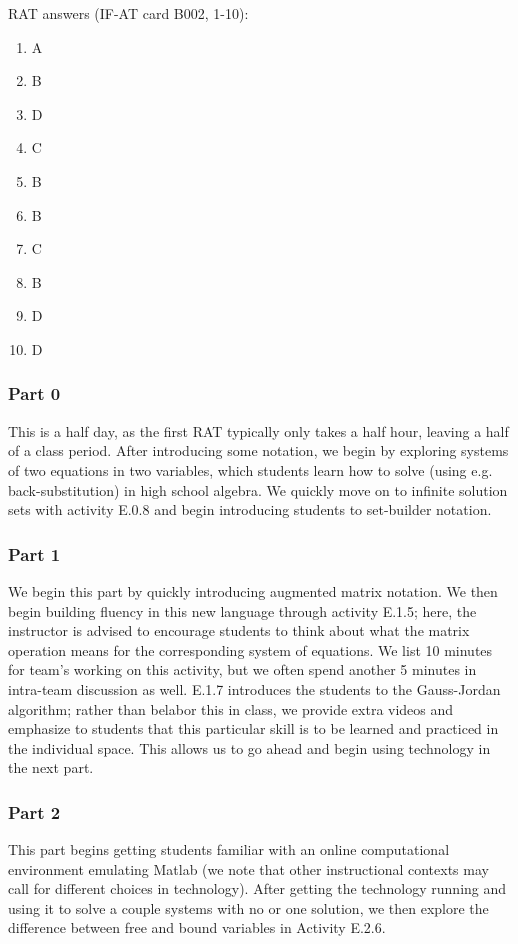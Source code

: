 \documentclass{article}
\begin{document}
RAT answers (IF-AT card B002, 1-10):
\begin{multicols}{10}
\begin{enumerate}[1)]
\item A
\item B
\item D
\item C
\item B
\item B
\item C
\item B
\item D
\item D
\end{enumerate}
\end{multicols}

\subsubsection*{Part 0}
This is a half day, as the first RAT typically only takes a half hour, leaving a half of a class period.  After introducing some notation, we begin by exploring systems of two equations in two variables, which students learn how to solve (using e.g. back-substitution) in high school algebra.  We quickly move on to infinite solution sets with activity E.0.8 and begin introducing students to set-builder notation.


\subsubsection*{Part 1}
We begin this part by quickly introducing augmented matrix notation.  We then begin building fluency in this new language through activity E.1.5; here, the instructor is advised to encourage students to think about what the matrix operation means for the corresponding system of equations.  We list 10 minutes for team's working on this activity, but we often spend another 5 minutes in intra-team discussion as well.  E.1.7 introduces the students to the Gauss-Jordan algorithm; rather than belabor this in class, we provide extra videos and emphasize to students that this particular skill is to be learned and practiced in the individual space.  This allows us to go ahead and begin using technology in the next part.

\subsubsection*{Part 2}
This part begins getting students familiar with an online computational environment emulating Matlab (we note that other instructional contexts may call for different choices in technology).  After getting the technology running and using it to solve a couple systems with no or one solution, we then explore the difference between free and bound variables in Activity E.2.6.
\end{document}
